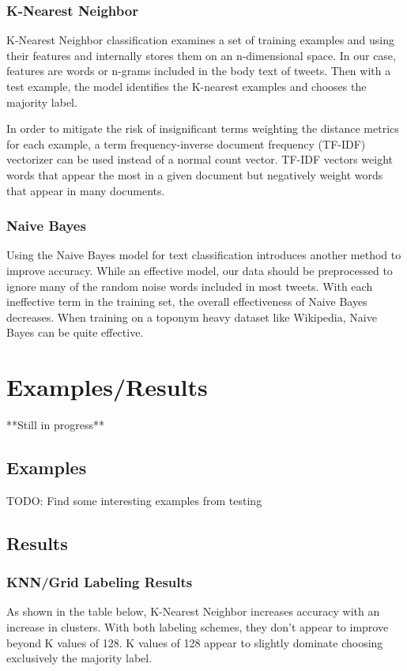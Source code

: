 \documentclass[midd]{thesis}
\begin{document}
\subsection{K-Nearest Neighbor}

K-Nearest Neighbor classification examines a set of training examples and using their features and internally stores them on an n-dimensional space. In our case, features are words or n-grams included in the body text of tweets. Then with a test example, the model identifies the K-nearest examples and chooses the majority label.

In order to mitigate the risk of insignificant terms weighting the distance metrics for each example, a term frequency-inverse document frequency (TF-IDF) vectorizer can be used instead of a  normal count vector. TF-IDF vectors weight words that appear the most in a given document but negatively weight words that appear in many documents.


\subsection{Naive Bayes}

Using the Naive Bayes model for text classification introduces another method to improve accuracy. While an effective model, our data should be preprocessed to ignore many of the random noise words included in most tweets. With each ineffective term in the training set, the overall effectiveness of Naive Bayes decreases. When training on a toponym heavy dataset like Wikipedia, Naive Bayes can be quite effective.




\chapter{Examples/Results}
**Still in progress**
\section{Examples}
TODO: Find some interesting examples from testing

\section{Results}
\subsection{KNN/Grid Labeling Results}
As shown in the table below, K-Nearest Neighbor increases accuracy with an increase in clusters. With both labeling schemes, they don't appear to improve beyond K values of 128. K values of 128 appear to slightly dominate choosing exclusively the majority label.
\end{document}
